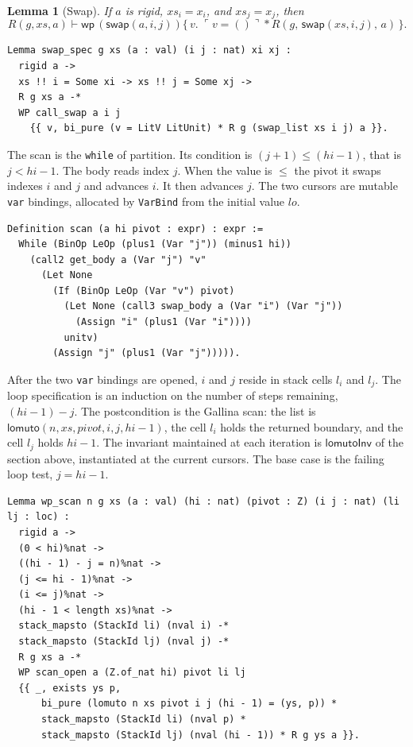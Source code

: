 \documentclass[11pt]{article}
\newtheorem{lemma}[theorem]{Lemma}
\newcommand{\sep}{\mathbin{*}}
\newcommand{\Wpre}{\mathsf{wp}}
\newcommand{\pure}[1]{\ulcorner #1 \urcorner}
\begin{document}
\begin{lemma}[Swap]
If \(a\) is rigid, \(xs_i = x_i\), and \(xs_j = x_j\), then
\[
R(g, xs, a) \vdash
  \Wpre\,(\mathsf{swap}(a, i, j))
  \{\,v.\; \pure{v = ()} \sep R(g,\, \mathsf{swap}(xs, i, j),\, a)\,\}.
\]
\end{lemma}

\begin{lstlisting}
Lemma swap_spec g xs (a : val) (i j : nat) xi xj :
  rigid a ->
  xs !! i = Some xi -> xs !! j = Some xj ->
  R g xs a -*
  WP call_swap a i j
    {{ v, bi_pure (v = LitV LitUnit) * R g (swap_list xs i j) a }}.
\end{lstlisting}

The scan is the \texttt{while} of partition.
Its condition is \((j + 1) \le (hi - 1)\), that is \(j < hi - 1\).
The body reads index \(j\).
When the value is \(\le\) the pivot it swaps indexes \(i\) and \(j\) and advances \(i\).
It then advances \(j\).
The two cursors are mutable \texttt{var} bindings, allocated by \texttt{VarBind} from the initial value \(lo\).

\begin{lstlisting}
Definition scan (a hi pivot : expr) : expr :=
  While (BinOp LeOp (plus1 (Var "j")) (minus1 hi))
    (call2 get_body a (Var "j") "v"
      (Let None
        (If (BinOp LeOp (Var "v") pivot)
          (Let None (call3 swap_body a (Var "i") (Var "j"))
            (Assign "i" (plus1 (Var "i"))))
          unitv)
        (Assign "j" (plus1 (Var "j"))))).
\end{lstlisting}

After the two \texttt{var} bindings are opened, \(i\) and \(j\) reside in stack cells \(l_i\) and \(l_j\).
The loop specification is an induction on the number of steps remaining, \((hi - 1) - j\).
The postcondition is the Gallina scan: the list is \(\mathsf{lomuto}(n, xs, \mathit{pivot}, i, j, hi - 1)\), the cell \(l_i\) holds the returned boundary, and the cell \(l_j\) holds \(hi - 1\).
The invariant maintained at each iteration is \(\mathsf{lomutoInv}\) of the section above, instantiated at the current cursors.
The base case is the failing loop test, \(j = hi - 1\).

\begin{lstlisting}
Lemma wp_scan n g xs (a : val) (hi : nat) (pivot : Z) (i j : nat) (li lj : loc) :
  rigid a ->
  (0 < hi)%nat ->
  ((hi - 1) - j = n)%nat ->
  (j <= hi - 1)%nat ->
  (i <= j)%nat ->
  (hi - 1 < length xs)%nat ->
  stack_mapsto (StackId li) (nval i) -*
  stack_mapsto (StackId lj) (nval j) -*
  R g xs a -*
  WP scan_open a (Z.of_nat hi) pivot li lj
  {{ _, exists ys p,
      bi_pure (lomuto n xs pivot i j (hi - 1) = (ys, p)) *
      stack_mapsto (StackId li) (nval p) *
      stack_mapsto (StackId lj) (nval (hi - 1)) * R g ys a }}.
\end{lstlisting}
\end{document}

